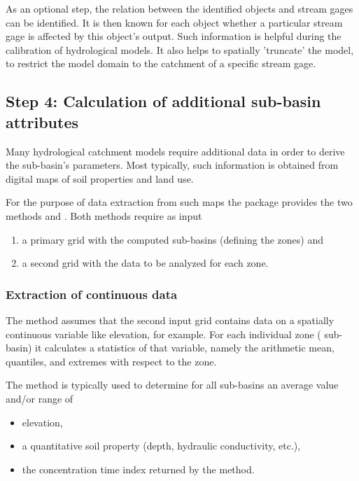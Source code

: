 As an optional step, the relation between the identified objects and stream gages can be identified. It is then known for each object whether a particular stream gage is affected by this object's output. Such information is helpful during the calibration of hydrological models. It also helps to spatially 'truncate' the model, \ie{} to restrict the model domain to the catchment of a specific stream gage.

\subsection{Step 4: Calculation of additional sub-basin attributes}
Many hydrological catchment models require additional data in order to derive the sub-basin's parameters. Most typically, such information is obtained from digital maps of soil properties and land use. 

For the purpose of data extraction from such maps the  package provides the two methods  and . Both methods require as input
\begin{enumerate}
  \item a primary grid with the computed sub-basins (defining the zones) and
  \item a second grid with the data to be analyzed for each zone.
\end{enumerate}

\subsubsection*{Extraction of continuous data}
The  method assumes that the second input grid contains data on a spatially continuous variable like elevation, for example. For each individual zone (\ie{} sub-basin) it calculates a statistics of that variable, namely the arithmetic mean, quantiles, and extremes with respect to the zone.

The method is typically used to determine for all sub-basins an average value and/or range of
\begin{itemize}
  \item elevation,
  \item a quantitative soil property (depth, hydraulic conductivity, etc.),
  \item the concentration time index returned by the  method.
\end{itemize}


